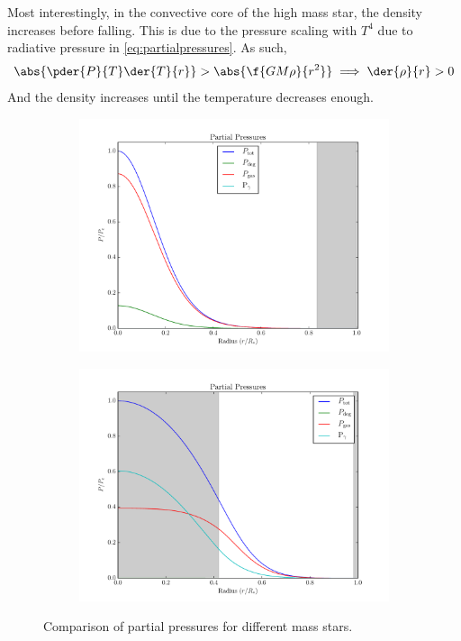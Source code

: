 \documentclass[11pt]{article}
\begin{document}
    Most interestingly, in the convective core of the high mass star, the density increases before falling. This is due to the pressure scaling with $T^4$ due to radiative pressure in \eqref{eq:partialpressures}. As such,
    \[ \abs{\pder{P}{T}\der{T}{r}} > \abs{\f{GM\rho}{r^2}} \implies \der{\rho}{r} > 0 \]
    And the density increases until the temperature decreases enough.
    \begin{center}
        \begin{figure}[H]
            \begin{subfigure}{.5\textwidth}
                \centering
                \includegraphics[width=1.1\textwidth]{figures/lowmass/partial_pressure.pdf}
            \end{subfigure}
            \begin{subfigure}{.5\textwidth}
                \centering
                \includegraphics[width=1.1\textwidth]{figures/highmass/partial_pressure.pdf}
            \end{subfigure}
            \caption{Comparison of partial pressures for different mass stars.}
            \label{fig:pressurecomparisonmass}
        \end{figure}
    \end{center}
\end{document}
